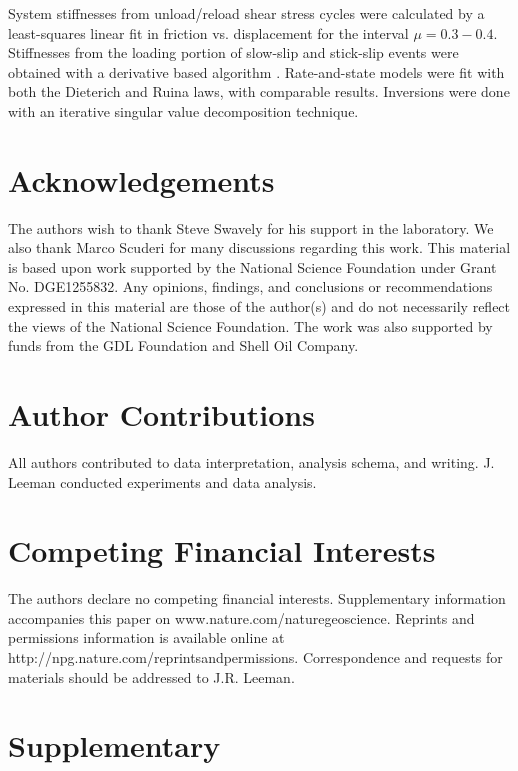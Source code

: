 \documentclass[11pt]{article}
\begin{document}
System stiffnesses from unload/reload shear stress cycles were calculated by a
least-squares linear fit in friction vs. displacement for the interval $\mu =
0.3-0.4$. Stiffnesses from the loading portion of slow-slip and stick-slip
events were obtained with a derivative based algorithm \cite{Leeman:2015}.
Rate-and-state models were fit with both the Dieterich and
Ruina laws, with comparable results. Inversions were done with an iterative
singular value decomposition technique.



\section{Acknowledgements}
The authors wish to thank Steve Swavely for his support in the laboratory.
We also thank Marco Scuderi for many discussions regarding this work. This
material is based upon work supported by the National Science Foundation under
Grant No. DGE1255832.  Any opinions, findings, and conclusions or
recommendations expressed in this material are those of the author(s) and do not
necessarily reflect the views of the National Science Foundation. The work was
also supported by funds from the GDL Foundation and Shell Oil Company.

\section{Author Contributions}
All authors contributed to data interpretation, analysis schema, and writing.
J. Leeman conducted experiments and data analysis.

\section{Competing Financial Interests}
The authors declare no competing financial interests. Supplementary information
accompanies this paper on www.nature.com/naturegeoscience. Reprints and permissions information is
available online at http://npg.nature.com/reprintsandpermissions. Correspondence
and requests for materials should be addressed to J.R. Leeman.

\newpage
\section{Supplementary}
\end{document}

